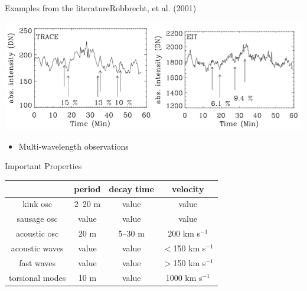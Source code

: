 \documentclass[table]{beamer}
\begin{document}
\begin{frame}[t]{Examples from the literature}{Robbrecht, et al. (2001)}
    \begin{block}{}
        \includegraphics[width=\textwidth]{pac1.png}
    \end{block}
    \begin{block}{}
        \begin{itemize}
            \item Multi-wavelength observations
        \end{itemize}
    \end{block}
\end{frame}%
\begin{frame}{Important Properties}
\begin{center}
    \begin{tabular}{c|c|c|c|}
    \cline{2-4} & {\textbf{period}} &
        {\textbf{decay time}} &
        {\textbf{velocity}}\\
    \hline \multicolumn{0}{|c|}{kink osc} &
        2--20 m & value & value\\
    \hline \multicolumn{0}{|c|}{sausage osc} &
        value & value & value\\
    \hline \multicolumn{0}{|c|}{acoustic osc} &
        20 m & 5--30 m & 200 km s$^{-1}$\\
    \hline \multicolumn{0}{|c|}{acoustic waves} &
        value & value & $<$150 km s$^{-1}$\\
    \hline \multicolumn{0}{|c|}{fast waves} &
        value & value & $>$150 km s$^{-1}$\\
    \hline \multicolumn{0}{|c|}{torsional modes} &
        10 m & value & 1000 km s$^{-1}$\\
    \hline
    \end{tabular}
\end{center}
\end{frame}%
\end{document}
